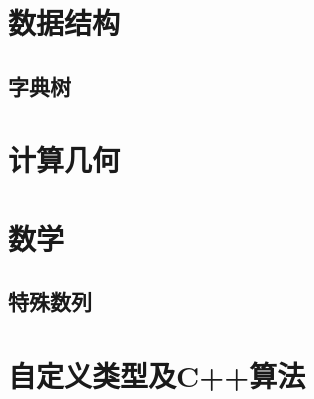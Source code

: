 \documentclass[12pt,a4paper,titlepage]{article}
\begin{document}
\section{\LARGE 数据结构}

	

	
    

	

    \subsection{字典树}
    
    

    

\section{\LARGE 计算几何}
    
    
    
	
	

\section{\LARGE 数学}
    
    
    
	
    
    
	

    \subsection{特殊数列}
    
    
    
	

\section{\LARGE 自定义类型及C++算法}
    
    

\end{document}
